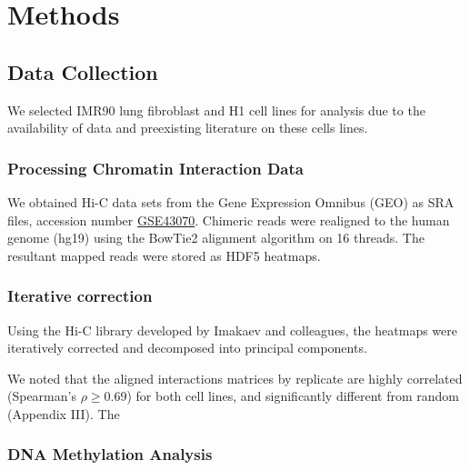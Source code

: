 \chapter{Methods}

\section*{Data Collection}

We selected IMR90 lung fibroblast and H1  cell lines for analysis due to the availability of data and
preexisting literature on these cells lines.

\subsection*{Processing Chromatin Interaction Data}

We obtained Hi-C data sets from the Gene Expression Omnibus (GEO)\cite{edgar2002} as \gls{SRA} files,
accession number \href{http://www.ncbi.nlm.nih.gov/geo/query/acc.cgi?acc=GSE43070}{GSE43070}.  Chimeric reads were realigned
to the human genome (hg19) using the BowTie2 alignment algorithm on 16 threads\cite{langmead2012}.  The resultant mapped
reads were stored as HDF5 heatmaps.

\subsection*{Iterative correction}
Using the Hi-C library developed by Imakaev and colleagues\cite{imakaev2012}, the heatmaps were iteratively corrected
and decomposed into principal components.

We noted that the aligned interactions matrices by replicate are highly correlated (Spearman's $\rho \geq 0.69$)  %
for both cell lines, and significantly different from random (Appendix III).  The



\subsection*{DNA Methylation Analysis}

